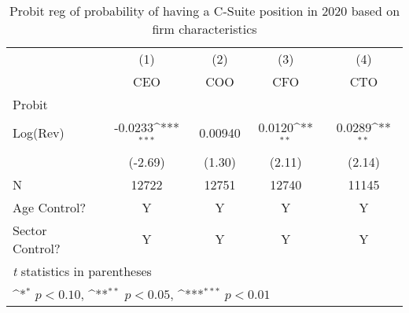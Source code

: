 \begin{table}[htbp]\centering
\def\sym#1{\ifmmode^{#1}\else\(^{#1}\)\fi}
\caption{Probit reg of probability of having a C-Suite position in 2020 based on firm characteristics\label{tab1}}
\begin{tabular}{l*{4}{c}}
\toprule
                    &\multicolumn{1}{c}{(1)}&\multicolumn{1}{c}{(2)}&\multicolumn{1}{c}{(3)}&\multicolumn{1}{c}{(4)}\\
                    &\multicolumn{1}{c}{CEO}&\multicolumn{1}{c}{COO}&\multicolumn{1}{c}{CFO}&\multicolumn{1}{c}{CTO}\\
\midrule
Probit              &                     &                     &                     &                     \\
Log(Rev)            &     -0.0233\sym{***}&     0.00940         &      0.0120\sym{**} &      0.0289\sym{**} \\
                    &     (-2.69)         &      (1.30)         &      (2.11)         &      (2.14)         \\
\midrule
N                   &       12722         &       12751         &       12740         &       11145         \\
Age Control?        &           Y         &           Y         &           Y         &           Y         \\
Sector Control?     &           Y         &           Y         &           Y         &           Y         \\
\bottomrule
\multicolumn{5}{l}{\footnotesize \textit{t} statistics in parentheses}\\
\multicolumn{5}{l}{\footnotesize \sym{*} \(p<0.10\), \sym{**} \(p<0.05\), \sym{***} \(p<0.01\)}\\
\end{tabular}
\end{table}
